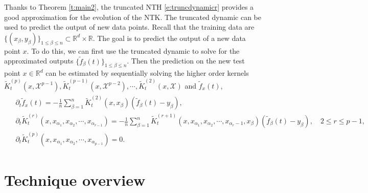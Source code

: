 \documentclass{article}
\numberwithin{equation}{section}
\newcommand\cX{{\mathcal X}}
\newcommand{\bR}{{\mathbb R}}
\newcommand{\al}{\alpha}
\renewcommand{\leq}{\leqslant}
\newcommand{\del}{\partial}
\newcommand{\1}{\mathds{1}}
\theoremstyle{plain} %
\begin{document}
Thanks to Theorem \ref{t:main2}, the truncated NTH \eqref{e:truncdynamicr} provides a good approximation for the evolution of the NTK. The truncated dynamic can be used to predict the output of new data points. Recall that the training data are $\{(x_\beta, y_\beta)\}_{1\leq \beta\leq n}\subset \bR^d\times \bR$. The goal is to predict the output of a new data point $x$. To do this, we can first use the truncated dynamic to solve for the approximated outputs $\{\tilde f_\beta(t)\}_{1\leq \beta\leq n}$. Then the prediction on the new test point $x\in \bR^d$ can be estimated 
by sequentially solving the higher order kernels $\tilde K_t^{(p)}(x,\cX^{p-1}), \tilde K_t^{(p-1)}(x,\cX^{p-2}),\cdots, \tilde K_t^{(2)}(x,\cX)$ and $\tilde f_x(t)$,
\begin{align}\begin{split}\label{e:preddynamic}
&\del_t\tilde f_x(t)=-\frac{1}{n}  \sum_{\beta=1}^n \tilde K^{(2)}_t(x, x_{\beta})(\tilde f_\beta(t)-y_\beta),\\
&\del_t\tilde K_t^{(r)}(x, x_{\al_1}, x_{\al_2}, \cdots, x_{\al_{r-1}})=-\frac{1}{n} \sum_{\beta=1}^n \tilde K_t^{(r+1)}(x, x_{\al_1}, x_{\al_2}, \cdots, x_{\al_r-1}, x_\beta)(\tilde f_\beta(t)-y_\beta), \quad 2\leq r \leq p-1,\\
&\del_t\tilde K_t^{(p)}(x, x_{\al_1}, x_{\al_2}, \cdots, x_{\al_{p-1}})=0.
\end{split}\end{align}


\section{Technique overview}\label{s:outline}
\end{document}
